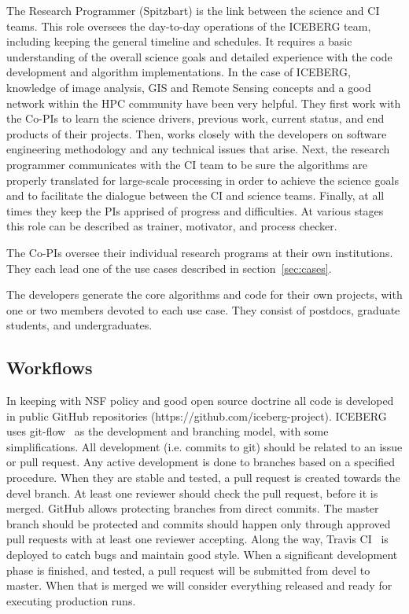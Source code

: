 \documentclass[manuscript,screen]{acmart}
\begin{document}
The Research Programmer (Spitzbart) is the link between the science and CI teams.  This role oversees the day-to-day operations of the ICEBERG team, including keeping the general timeline and schedules.
It requires a basic understanding of the overall science goals and detailed 
experience with the code development and algorithm implementations.  In the case of ICEBERG, knowledge of image analysis, GIS and Remote
Sensing concepts and a good network within the HPC community have been very helpful.  They 
first work with the Co-PIs to learn the science drivers, previous work, 
current status, and end products of their projects.  Then, works closely with the developers on software engineering methodology and any technical issues that arise.  Next, the research programmer communicates 
with the CI team to be sure the algorithms are properly translated for large-scale processing in order to achieve the science goals and to facilitate the dialogue between the CI and science teams.  Finally, at all times they keep the PIs apprised of progress and difficulties.  At various stages this 
role can be described as trainer, motivator, and process checker. 

The Co-PIs oversee their individual research programs at their own institutions.  They each lead one of the use cases described in section~\ref{sec:cases}.

The developers generate the core algorithms and code for their own projects, with one or two members devoted to each use case.  They consist of postdocs, graduate students, and undergraduates.
\subsection{Workflows}
In keeping with NSF policy and good open source doctrine all code is developed
in public GitHub repositories (https://github.com/iceberg-project).
ICEBERG uses git-flow~\cite{gitflow:20} as the development and branching  
model, with some simplifications.  All development (i.e. commits to git) 
should be related to an issue or pull request.  Any active development is 
done to branches based on a specified procedure. When they are stable and 
tested, a pull request is created towards the devel branch. At least one 
reviewer should check the pull request, before it is merged. GitHub allows 
protecting branches from direct commits. The master branch should be 
protected and commits should happen only through approved pull requests with 
at least one reviewer accepting.  Along the way, Travis CI~\cite{travis:20}
is deployed to catch bugs and maintain good style.  
When a significant development phase is finished, and tested, a pull request will be submitted from devel to master. When that is merged we will consider everything released and ready for executing production runs.
\end{document}
